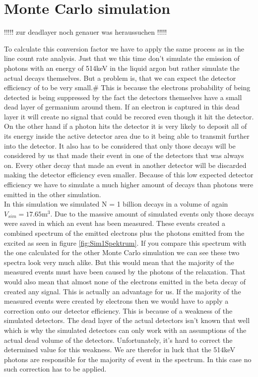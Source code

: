 \documentclass[encoding=utf8,british]{tumphthesis}
\begin{document}
\section{Monte Carlo simulation}
\label{sec:MonteCarlo2}


!!!!! zur deadlayer noch genauer was heraussuchen !!!!!

To calculate this conversion factor we have to apply the same process as in the line count rate analysis.
Just that we this time don't simulate the emission of photons with an energy of 514keV in the liquid argon but rather simulate the actual \Kr decays themselves.
But a problem is, that we can expect the detector efficiency of \Kr to be very small.#
This is because the electrons probability of being detected is being suppressed by the fact the detectors themselves have a small dead layer of germanium around them.
If an electron is captured in this dead layer it will create no signal that could be recored even though it hit the detector.
On the other hand if a photon hits the detector it is very likely to deposit all of its energy inside the active detector area due to it being able to transmit further into the detector.
It also has to be considered that only those decays will be considered by us that made their event in one of the detectors that was always on.
Every other decay that made an event in another detector will be discarded making the detector efficiency even smaller. 
Because of this low expected detector efficiency we have to simulate a much higher amount of decays than photons were emitted in the other simulation.
\\

In this simulation we simulated N = 1 billion \Kr decays in a volume of again $V_{sim} = 17.65 \mathrm{m}^3$.
Due to the massive amount of simulated events only those decays were saved in which an event has been measured.
These events created a combined spectrum of the emitted electrons plus the photons emitted from the excited  as seen in figure \ref{fig:Sim1Spektrum}.
If you compare this spectrum with the one calculated for the other Monte Carlo simulation we can see these two spectra look very much alike.
But this would mean that the majority of the measured events must have been caused by the photons of the  relaxation.
That would also mean that almost none of the electrons emitted in the beta decay of \Kr created any signal.
This is actually an advantage for us.
If the majority of the measured events were created by electrons then we would have to apply a correction onto our detector efficiency.
This is because of a weakness of the simulated detectors.
The dead layer of the actual detectors isn't known that well which is why the simulated detectors can only work with an assumptions of the actual dead volume of the detectors.
Unfortunately, it's hard to correct the determined value for this weakness.
We are therefor in luck that the 514keV photons are responsible for the majority of event in the spectrum.
In this case no such correction has to be applied.
\\
\end{document}
